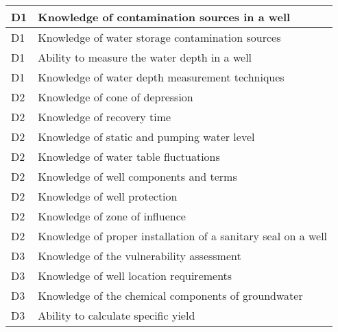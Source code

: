 \begin{table}[H]
\begin{tabular}{| m{1cm} | m{15cm} |}
D1 & Knowledge of   contamination sources in a well                                                                                    \\ \hline
D1 & Knowledge of water   storage contamination sources                                                                                \\ \hline
D1 & Ability to measure   the water depth in a well                                                                                    \\ \hline
D1 & Knowledge of water   depth measurement techniques                                                                                 \\ \hline
D2 & Knowledge of cone of   depression                                                                                                 \\ \hline
D2 & Knowledge of recovery   time                                                                                                      \\ \hline
D2 & Knowledge of static   and pumping water level                                                                                     \\ \hline
D2 & Knowledge of water   table fluctuations                                                                                           \\ \hline
D2 & Knowledge of well   components and terms                                                                                          \\ \hline
D2 & Knowledge of well   protection                                                                                                    \\ \hline
D2 & Knowledge of zone of   influence                                                                                                  \\ \hline
D2 & Knowledge of proper   installation of a sanitary seal on a well                                                                   \\ \hline
D3 & Knowledge of the   vulnerability assessment                                                                                       \\ \hline
D3 & Knowledge of well   location requirements                                                                                         \\ \hline
D3 & Knowledge of the   chemical components of groundwater                                                                             \\ \hline
D3 & Ability to calculate   specific yield                                                                                             \\ \hline
\end{tabular}
\end{table}

